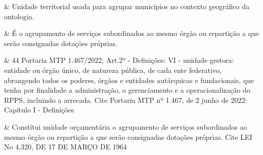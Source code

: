  &
Unidade territorial usada para agrupar municípios no contexto geográfico da ontologia. 
\\ \hline

 &
É o agrupamento de serviços subordinados ao mesmo órgão ou repartição a que serão consignadas dotações próprias. 
\\ \hline

 &
44 Portaria MTP 1.467/2022, Art.2º - Definições: VI - unidade gestora: entidade ou órgão único, de natureza pública, de cada ente federativo, abrangendo todos os poderes, órgãos e entidades autárquicas e fundacionais, que tenha por finalidade a administração, o gerenciamento e a operacionalização do RPPS, incluindo a arrecada. Cite Portaria MTP nº 1.467, de 2 junho de 2022: Capítulo I - Definições 
\\ \hline

 &
Constitui unidade orçamentária o agrupamento de serviços subordinados ao mesmo órgão ou repartição a que serão consignadas dotações próprias. Cite LEI No 4.320, DE 17 DE MARÇO DE 1964 
\\ \hline
